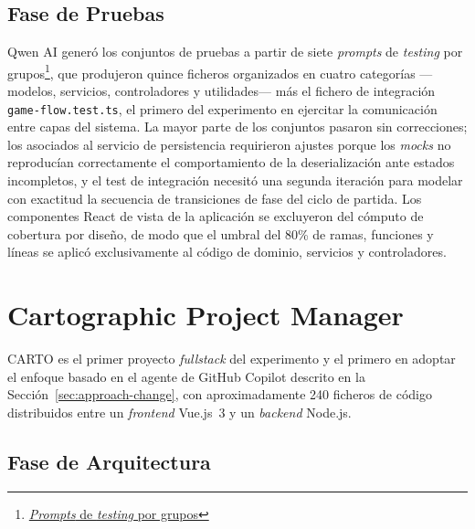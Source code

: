 \subsection{Fase de Pruebas}

Qwen AI generó los conjuntos de pruebas a partir de siete \textit{prompts} de \textit{testing} por grupos\footnote{\href{https://github.com/alu0101549491/TFG-Fabian-Gonzalez-Lence/tree/main/resources/prompts/3-MiniBalatro/5-TestingPorGrupodeModulos}{\textit{Prompts} de \textit{testing} por grupos}}, que produjeron quince ficheros organizados en cuatro categorías ---modelos, servicios, controladores y utilidades--- más el fichero de integración \texttt{game-flow.test.ts}, el primero del experimento en ejercitar la comunicación entre capas del sistema. La mayor parte de los conjuntos pasaron sin correcciones; los asociados al servicio de persistencia requirieron ajustes porque los \textit{mocks} no reproducían correctamente el comportamiento de la deserialización ante estados incompletos, y el test de integración necesitó una segunda iteración para modelar con exactitud la secuencia de transiciones de fase del ciclo de partida. Los componentes React de vista de la aplicación se excluyeron del cómputo de cobertura por diseño, de modo que el umbral del 80\% de ramas, funciones y líneas se aplicó exclusivamente al código de dominio, servicios y controladores.

\section{Cartographic Project Manager} \label{sec:dev-carto}

\ac{CARTO} es el primer proyecto \textit{fullstack} del experimento y el primero en adoptar el enfoque basado en el agente de GitHub Copilot descrito en la Sección~\ref{sec:approach-change}, con aproximadamente 240 ficheros de código distribuidos entre un \textit{frontend} Vue.js~3 y un \textit{backend} Node.js.

\subsection{Fase de Arquitectura}

